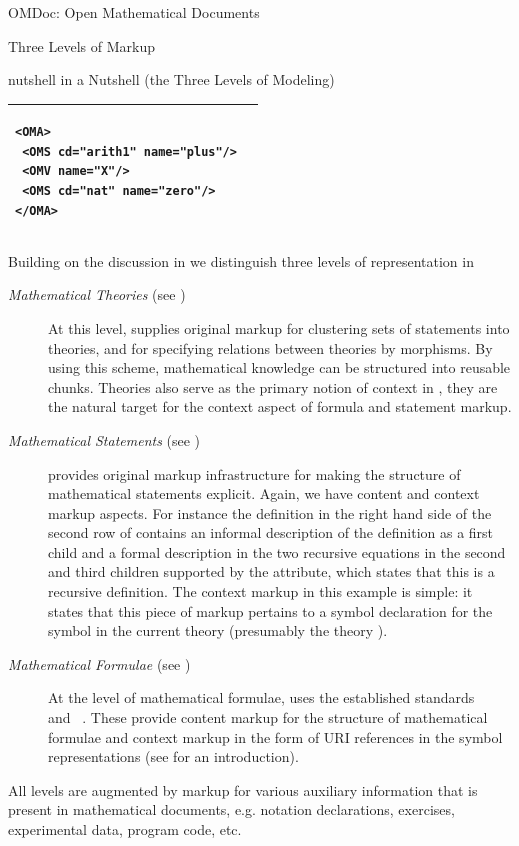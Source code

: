 \begin{tchapter}[id=omdoc-markup,short=Open Mathematical Documents]{OMDoc: Open Mathematical Documents}
\begin{tsection}[id=three-level-markup]{Three Levels of Markup}
\begin{myfig}{nutshell}{{\omdoc} in a Nutshell (the Three Levels of Modeling)}
\begin{tabular}{|p{5.2cm}|p{5.4cm}|}
{\begin{minipage}[t]{5.4cm}
\begin{lstlisting}[numbers=none,frame=none]
<OMA>
 <OMS cd="arith1" name="plus"/>
 <OMV name="X"/>
 <OMS cd="nat" name="zero"/>
</OMA>
\end{lstlisting}\vspace{-3ex}\end{minipage}}\\\hline
\end{tabular}
\end{myfig}
Building on the discussion in {} we distinguish three levels of
representation in {\omdoc}
\begin{description}
\item[\emph{Mathematical Theories} (see {})] At this level,
  {\omdoc} supplies original markup for clustering sets of statements into theories, and
  for specifying relations between theories by morphisms. By using this scheme,
  mathematical knowledge can be structured into reusable chunks. Theories also serve as
  the primary notion of context in {\omdoc}, they are the natural target for the context
  aspect of formula and statement markup.
\item[\emph{Mathematical Statements} (see {})] {\omdoc} provides
  original mark\-up infrastructure for making the structure of mathematical statements
  explicit.  Again, we have content and context markup aspects. For instance the
  definition in the right hand side of the second row of {} contains an
  informal description of the definition as a first child and a formal description in the
  two recursive equations in the second and third children supported by the
  {} attribute, which states that this is a recursive
  definition. The context markup in this example is simple: it states that this piece of
  markup pertains to a symbol declaration for the symbol {} in the current
  theory (presumably the theory {}).
\item[\emph{Mathematical Formulae} (see {})] At the level of
  mathematical formulae, {\omdoc} uses the established standards
  {\openmath}~\cite{BusCapCar:2oms04} and {\cmathml}~\cite{CarIon:MathML03}.  These
  provide content markup for the structure of mathematical formulae and context markup in
  the form of URI references in the symbol representations (see {} for an
  introduction).
\end{description}
All levels are augmented by markup for various auxiliary information that is
present in mathematical documents, e.g. notation declarations, exercises,
experimental data, program code, etc.
\end{tsection}


\end{tchapter}
